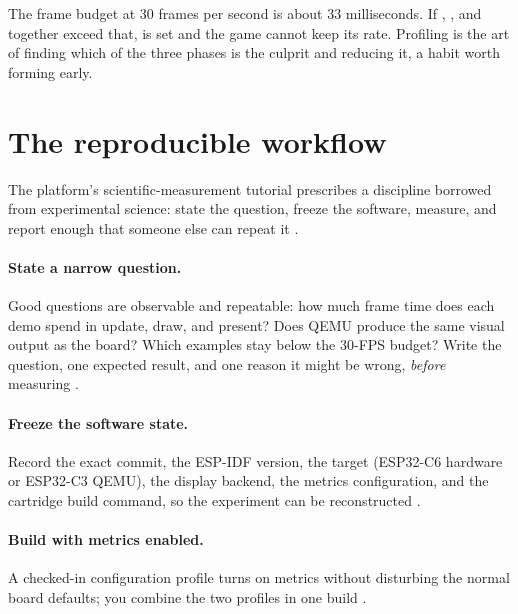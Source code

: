 \begin{prgconcept}
The frame budget at 30 frames per second is about 33 milliseconds. If
, , and  together exceed that,
 is set and the game cannot keep its rate. Profiling is the
art of finding which of the three phases is the culprit and reducing it, a habit
worth forming early.
\end{prgconcept}

\section{The reproducible workflow}

The platform's scientific-measurement tutorial prescribes a discipline borrowed
from experimental science: state the question, freeze the software, measure, and
report enough that someone else can repeat it \citep{prg32scimeasure}.

\paragraph{State a narrow question.} Good questions are observable and repeatable:
how much frame time does each demo spend in update, draw, and present? Does QEMU
produce the same visual output as the board? Which examples stay below the 30-FPS
budget? Write the question, one expected result, and one reason it might be wrong,
\emph{before} measuring \citep{prg32scimeasure}.

\paragraph{Freeze the software state.} Record the exact commit, the ESP-IDF
version, the target (ESP32\nobreakdash-C6 hardware or ESP32\nobreakdash-C3 QEMU), the display backend,
the metrics configuration, and the cartridge build command, so the experiment can
be reconstructed \citep{prg32scimeasure}.



\paragraph{Build with metrics enabled.} A checked-in configuration profile turns
on metrics without disturbing the normal board defaults; you combine the two
profiles in one build \citep{prg32metrics}.

